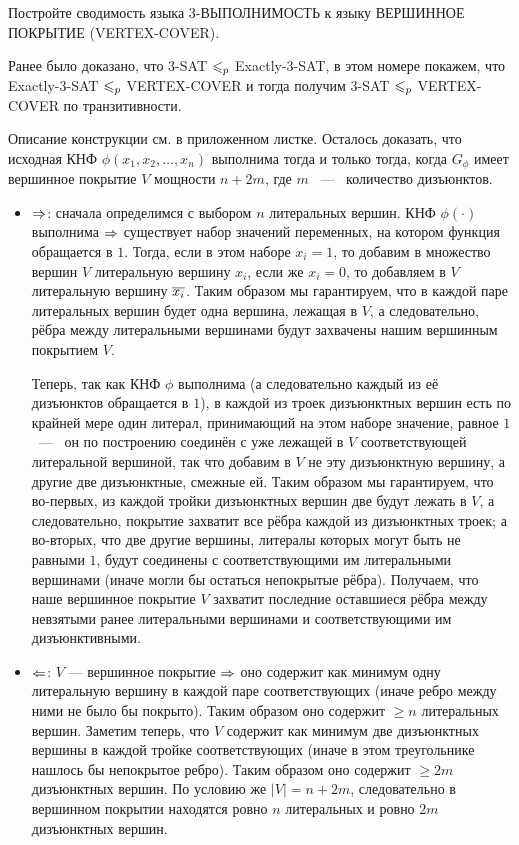 \documentclass[a4paper,12pt]{article}
\begin{document}
\begin{tasknum}{3}
	Постройте сводимость языка 3-ВЫПОЛНИМОСТЬ к языку ВЕРШИННОЕ ПОКРЫТИЕ (VERTEX-COVER).
\end{tasknum}

\begin{solution}
	
	Ранее было доказано, что 3-SAT $\leqslant_p$ Exactly-3-SAT, в этом номере покажем, что Exactly-3-SAT $\leqslant_p$ VERTEX-COVER и тогда получим 3-SAT $\leqslant_p$ VERTEX-COVER по транзитивности.
	
	Описание конструкции см. в приложенном листке. Осталось доказать, что исходная
	КНФ $\phi(x_1, x_2, \ldots, x_n)$ выполнима тогда и только тогда, когда $G_\phi$ имеет вершинное покрытие $V$ мощности $n+2m$, где $m$ ~---~ количество дизъюнктов.
	
	\begin{itemize}
		\item $\Rightarrow$: сначала определимся с выбором $n$ литеральных вершин. КНФ $\phi(\cdot)$ выполнима $\Rightarrow$ существует набор значений переменных, на котором функция обращается в $1$. Тогда, если в этом наборе $x_i = 1$, то добавим в множество вершин $V$ литеральную вершину $x_i$, если же $x_i = 0$, то добавляем в $V$ литеральную вершину $\overline{x_i}$. Таким образом мы гарантируем, что в каждой паре литеральных вершин будет одна вершина, лежащая в $V$, а следовательно, рёбра между литеральными вершинами будут захвачены нашим вершинным покрытием $V$.
		
		 Теперь, так как КНФ $\phi$ выполнима (а следовательно каждый из её дизъюнктов обращается в $1$), в каждой из троек дизъюнктных вершин есть по крайней мере один литерал, принимающий на этом наборе значение, равное $1$ ~---~ он по построению соединён с уже лежащей в $V$ соответствующей литеральной вершиной, так что добавим в $V$ не эту дизъюнктную вершину, а другие две дизъюнктные, смежные ей. Таким образом мы гарантируем, что во-первых, из каждой тройки дизъюнктных вершин две будут лежать в $V$, а следовательно, покрытие захватит все рёбра каждой из дизъюнктных троек; а во-вторых, что две другие вершины, литералы которых могут быть не равными $1$, будут соединены с соответствующими им литеральными вершинами (иначе могли бы остаться непокрытые рёбра). Получаем, что наше вершинное покрытие $V$ захватит последние оставшиеся рёбра между невзятыми ранее литеральными вершинами и соответствующими им дизъюнктивными.
		 
		 \item $\Leftarrow$: $V$ --- вершинное покрытие $\Rightarrow$ оно содержит как минимум одну литеральную вершину в каждой паре соответствующих (иначе ребро между ними не было бы покрыто). Таким образом оно содержит $\ge n$ литеральных вершин. Заметим теперь, что $V$ содержит как минимум две дизъюнктных вершины в каждой тройке соответствующих (иначе в этом треугольнике нашлось бы непокрытое ребро). Таким образом оно содержит $\ge 2m$ дизъюнктных вершин. По условию же $|V| = n + 2m$, следовательно в вершинном покрытии находятся ровно $n$ литеральных и ровно $2m$ дизъюнктных вершин.
		 

\end{itemize}
\end{solution}
\end{document}
